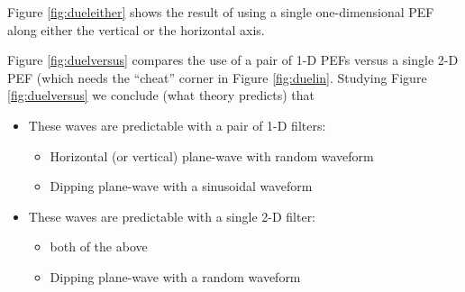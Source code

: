 \par
Figure \ref{fig:dueleither} shows
the result of using a single one-dimensional PEF
along either the vertical or the horizontal axis.



\par

Figure \ref{fig:duelversus} compares
the use of a pair of 1-D PEFs versus a single 2-D PEF
(which needs the ``cheat'' corner in Figure \ref{fig:duelin}.
Studying Figure \ref{fig:duelversus} we conclude
(what theory predicts) that
\begin{itemize}
        \item These waves are predictable with a pair of 1-D filters:
        \begin{itemize}
                \item Horizontal (or vertical) plane-wave with random waveform
                \item Dipping plane-wave with a sinusoidal waveform
        \end{itemize}
        \item These waves are predictable with a single 2-D filter:
        \begin{itemize}
                \item both of the above
                \item Dipping plane-wave with a random waveform
        \end{itemize}
\end{itemize}

